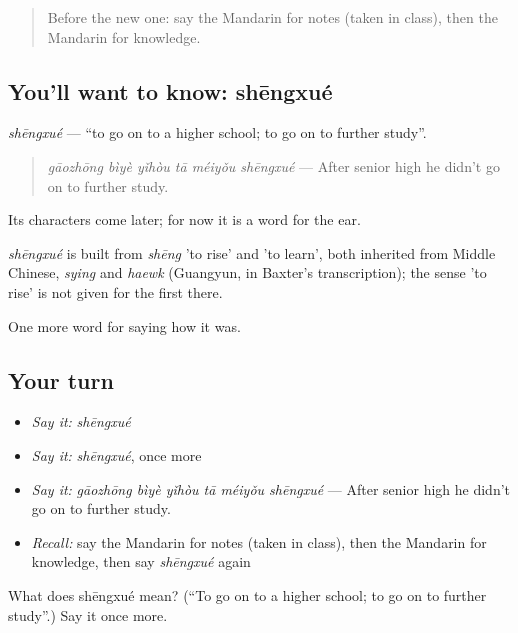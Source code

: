 \label{lesson:ZH-C497-shengxue}



\begin{quote}
Before the new one: say the Mandarin for notes (taken in class), then the Mandarin for knowledge.
\end{quote}

\subsection*{You'll want to know: shēngxué}
\emph{shēngxué} — \textquotedblleft{}to go on to a higher school; to go on to further study\textquotedblright{}.

\begin{quote}
\emph{gāozhōng bìyè yǐhòu tā méiyǒu shēngxué} — After senior high he didn't go on to further study.
\end{quote}

Its characters come later; for now it is a word for the ear.

\begin{cousinweb}
\emph{shēngxué} is built from \emph{shēng} 'to rise' and  'to learn', both inherited from Middle Chinese, \emph{sying} and \emph{haewk} (Guangyun, in Baxter's transcription); the sense 'to rise' is not given for the first there.
\end{cousinweb}

\begin{grammarlens}[title={What you've built}]
One more word for saying how it was.
\end{grammarlens}

\subsection*{Your turn}
\begin{itemize}
\raggedright
  \item \emph{Say it:} \emph{shēngxué}
  \item \emph{Say it:} \emph{shēngxué}, once more
  \item \emph{Say it:} \emph{gāozhōng bìyè yǐhòu tā méiyǒu shēngxué} — After senior high he didn't go on to further study.
  \item \emph{Recall:} say the Mandarin for notes (taken in class), then the Mandarin for knowledge, then say \emph{shēngxué} again
\end{itemize}

\begin{tcolorbox}[breakable,colback=teal!4,colframe=teal!35!black,title={Before you move on}]
What does shēngxué mean? (\textquotedblleft{}To go on to a higher school; to go on to further study\textquotedblright{}.) Say it once more.
\end{tcolorbox}
